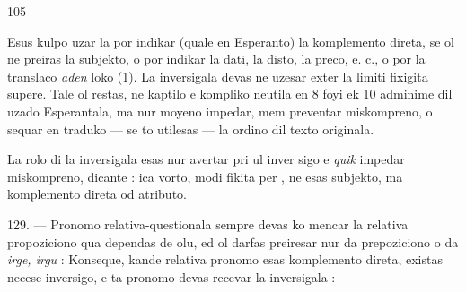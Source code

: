 \begin{VUpage}[109]{105}

Esus kulpo uzar la  por indikar (quale en Esperanto)\nl
la komplemento direta, se ol ne preiras la subjekto, o por\nl
indikar la dati, la disto, la preco, e. c., o por la translaco\nl
\textit{aden} loko (1). La  inversigala devas ne uzesar exter la\nl
limiti fixigita supere. Tale ol restas, ne kaptilo e kompliko\nl
neutila en 8 foyi ek 10 adminime dil uzado Esperantala, ma\nl
nur moyeno impedar, mem preventar miskompreno, o sequar\nl
en traduko --- se to utilesas --- la ordino dil texto originala.

La rolo di la  inversigala esas nur avertar pri ul inver\cc
sigo e \textit{quik} impedar miskompreno, dicante : ica vorto, modi\cc
fikita per , ne esas subjekto, ma komplemento direta od\nl
atributo.

\VUblanc{5.98pt}%
129. --- Pronomo relativa-questionala sempre devas ko\cc
mencar la relativa propoziciono qua dependas de olu, ed\nl
ol darfas preiresar nur da prepoziciono o da \textit{irge, irgu} :\nl
{}\nl
{}\nl
{}\nl
{} Konseque, kande relativa pronomo esas\nl
komplemento direta, existas necese inversigo, e ta pronomo\nl
devas recevar la  inversigala : \nl
{}


\end{VUpage}
